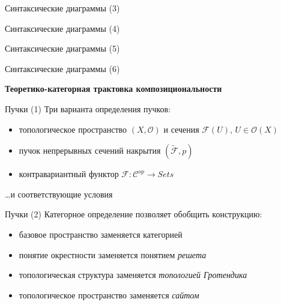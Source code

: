 \documentclass{beamer}
\begin{document}
\begin{frame}{Синтаксические диаграммы (3)}
\end{frame}

\begin{frame}{Синтаксические диаграммы (4)}
\end{frame}

\begin{frame}{Синтаксические диаграммы (5)}
\end{frame}

\begin{frame}{Синтаксические диаграммы (6)}
\end{frame}



\begin{frame}{}
\begin{center}
	\textbf{Теоретико-категорная трактовка композициональности}
\end{center}
\end{frame}

\begin{frame}{Пучки (1)}
Три варианта определения пучков:\\
\medskip
\begin{small}
\begin{itemize}
	\item топологическое пространство $(X, \mathcal{O})$ и сечения $\mathcal{F}(U)$, $U \in \mathcal{O}(X)$
	\item пучок непрерывных сечений накрытия $(\widetilde{\mathcal{F}}, p)$
	\item контравариантный функтор $\mathcal{F} : \mathcal{C}^{op} \to Sets$
\end{itemize}
\end{small}
\medskip
\dots и соответствующие условия
\end{frame}

\begin{frame}{Пучки (2)}
Категорное определение позволяет обобщить конструкцию:\\
\medskip
\begin{small}
\begin{itemize}
	\item базовое пространство заменяется категорией
	\item понятие окрестности заменяется понятием \textit{решета}
	\item топологическая структура заменяется \textit{топологией Гротендика}
	\item топологическое пространство заменяется \textit{сайтом}
\end{itemize}
\end{small}
\end{frame}
\end{document}

